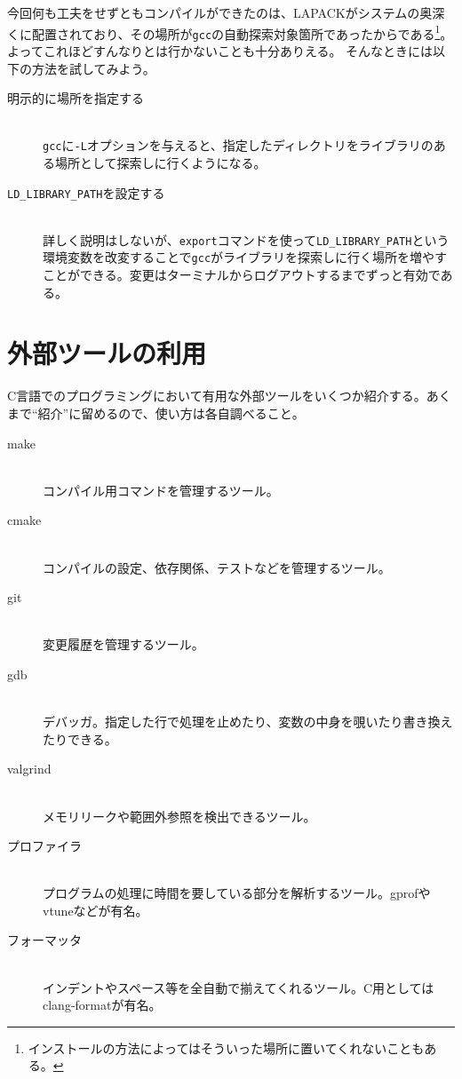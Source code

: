 今回何も工夫をせずともコンパイルができたのは、LAPACKがシステムの奥深くに配置されており、その場所が\texttt{gcc}の自動探索対象箇所であったからである\footnote{インストールの方法によってはそういった場所に置いてくれないこともある。}。よってこれほどすんなりとは行かないことも十分ありえる。
そんなときには以下の方法を試してみよう。
\begin{description}
    \item[明示的に場所を指定する]\mbox{}\\
          \texttt{gcc}に\texttt{-L}オプションを与えると、指定したディレクトリをライブラリのある場所として探索しに行くようになる。
    \item[\texttt{LD\_LIBRARY\_PATH}を設定する]\mbox{}\\
          詳しく説明はしないが、\texttt{export}コマンドを使って\texttt{LD\_LIBRARY\_PATH}という環境変数を改変することで\texttt{gcc}がライブラリを探索しに行く場所を増やすことができる。変更はターミナルからログアウトするまでずっと有効である。
\end{description}

\section{外部ツールの利用}
C言語でのプログラミングにおいて有用な外部ツールをいくつか紹介する。あくまで``紹介''に留めるので、使い方は各自調べること。
\begin{description}
    \item[make]\mbox{}\\
          コンパイル用コマンドを管理するツール。
    \item[cmake]\mbox{}\\
          コンパイルの設定、依存関係、テストなどを管理するツール。
    \item[git]\mbox{}\\
          変更履歴を管理するツール。
    \item[gdb]\mbox{}\\
          デバッガ。指定した行で処理を止めたり、変数の中身を覗いたり書き換えたりできる。
    \item[valgrind]\mbox{}\\
          メモリリークや範囲外参照を検出できるツール。
    \item[プロファイラ]\mbox{}\\
          プログラムの処理に時間を要している部分を解析するツール。gprofやvtuneなどが有名。
    \item[フォーマッタ]\mbox{}\\
          インデントやスペース等を全自動で揃えてくれるツール。C用としてはclang-formatが有名。
\end{description}

